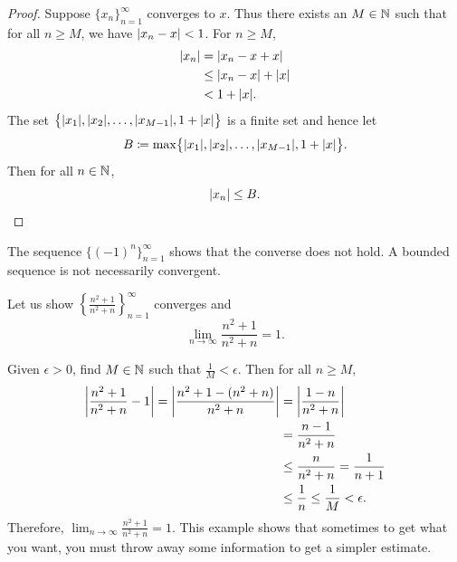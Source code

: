 \begin{proof}
Suppose $\{ x_n \}_{n=1}^\infty$ converges to $x$.  Thus there exists an $M \in {\mathbb{N}}$
such that for all $n \geq M$, we have
$\lvert {x_n - x} \rvert < 1$.  For $n \geq M$,
\begin{equation*}
\begin{split}
\lvert {x_n} \rvert & = \lvert {x_n - x + x} \rvert
\\
& \leq \lvert {x_n - x} \rvert + \lvert {x} \rvert
\\
& < 1 + \lvert {x} \rvert .
\end{split}
\end{equation*}
The set $\bigl\{ \lvert {x_1} \rvert, \lvert {x_2} \rvert, \ldots, \lvert {x_{M-1}} \rvert , 1+\lvert {x} \rvert \bigr\}$
is a finite set and hence let
\begin{equation*}
B \coloneqq \max \bigl\{ \lvert {x_1} \rvert, \lvert {x_2} \rvert, \ldots, \lvert {x_{M-1}} \rvert, 1+\lvert {x} \rvert \bigr\} .
\end{equation*}
Then for all $n \in {\mathbb{N}}$,
\begin{equation*}
\lvert {x_n} \rvert \leq B. \qedhere
\end{equation*}
\end{proof}

The sequence $\bigl\{ {(-1)}^n \bigr\}_{n=1}^\infty$ shows that the converse
does not hold.  A bounded sequence is not necessarily convergent.

\begin{example}
Let us show $\left\{ \frac{n^2+1}{n^2+n} \right\}_{n=1}^\infty$ converges and
\begin{equation*}
\lim_{n\to\infty} \frac{n^2+1}{n^2+n} = 1 .
\end{equation*}

Given $\epsilon > 0$,
find $M \in {\mathbb{N}}$ such that $\frac{1}{M} < \epsilon$.  Then for all $n \geq
M$,
\begin{equation*}
\begin{split}
\left\lvert {\frac{n^2+1}{n^2+n} - 1} \right\rvert  =
\left\lvert {\frac{n^2+1 - (n^2+n)}{n^2+n}} \right\rvert
& =
\left\lvert {\frac{1 - n}{n^2+n}} \right\rvert \\
& =
\frac{n-1}{n^2+n} \\
& \leq 
\frac{n}{n^2+n} 
 =
\frac{1}{n+1}  \\
& \leq \frac{1}{n}
\leq \frac{1}{M} < \epsilon .
\end{split}
\end{equation*}
Therefore,
$\lim_{n\to\infty} \frac{n^2+1}{n^2+n} = 1$.
This example shows that sometimes to get what you want, you must throw away
some information to get a simpler estimate.
\end{example}

